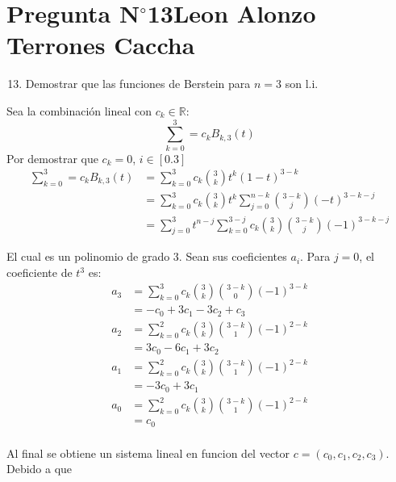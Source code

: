 \section{Pregunta N$^{\circ}$13\qquad Leon Alonzo Terrones Caccha}

\begin{frame}
    \begin{enumerate}\setcounter{enumi}{12}
        \item
            Demostrar que las funciones de Berstein para $n=3$ son l.i.
             
    \end{enumerate}

    \begin{solution}

    Sea la combinación lineal con $c_k\in\mathbb{R}:$
    \[\sum_{k=0}^{3}=c_{k}B_{k,3}(t)\]
    Por demostrar que $c_k=0$, $i\in[0.3]$
    \begin{align*}
        \sum_{k=0}^{3}=c_{k}B_{k,3}(t)&=\sum_{k=0}^{3}c_k\binom{3}{k}t^k(1-t)^{3-k}\\
        &=\sum_{k=0}^{3}{c_k\binom{3}{k}t^k\sum_{j=0}^{n-k}\binom{3-k}{j}{(-t)^{3-k-j}}}\\
        &=\sum_{j=0}^{3}{t^{n-j}\sum_{k=0}^{3-j}{c_k\binom{3}{k}\binom{3-k}{j}(-1)^{3-k-j}}}
    \end{align*}

    El cual es un polinomio de grado 3. Sean sus coeficientes $a_i$.
Para $j=0$, el coeficiente de $t^3$ es:
\begin{align*}
    a_{3}&=\sum_{k=0}^{3}{c_k\binom{3}{k}\binom{3-k}{0}(-1)^{3-k}}\\
    &=-c_0+3c_1-3c_2+c_3\\
    a_{2}&=\sum_{k=0}^{2}{c_k\binom{3}{k}\binom{3-k}{1}(-1)^{2-k}}\\
    &=3c_0-6c_1+3c_2\\
    a_{1}&=\sum_{k=0}^{2}{c_k\binom{3}{k}\binom{3-k}{1}(-1)^{2-k}}\\
    &=-3c_0+3c_1\\
    a_{0}&=\sum_{k=0}^{2}{c_k\binom{3}{k}\binom{3-k}{1}(-1)^{2-k}}\\
    &=c_0\\
\end{align*}


Al final se obtiene un sistema lineal en funcion del vector $c=(c_0,c_1,c_2,c_3)$. Debido a que 





    
    \begin{comment}
        \[
\begin{array}{cccccc}
x_0=0 & y_0=0 \\
    &     & 1 \\
x_1=1 & y_1=1 &             & \frac{\sqrt{3}-3}{6}\\
    &     & \frac{\sqrt{3}-1}{2}\\
x_2=3 & y_2=\sqrt{3}
\end{array}
\]
    \end{comment}

        
    \end{solution}
\end{frame}